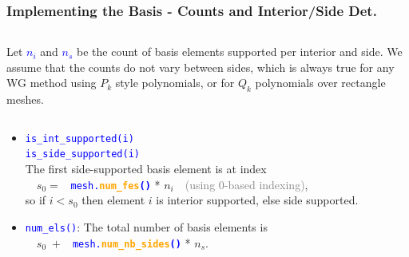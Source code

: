 \documentclass[compress]{beamer}
\begin{document}
\begin{frame}
  \frametitle{Implementing the Basis - Counts and Interior/Side Det.}
  \begin{columns}
      \small
      Let \textcolor{blue}{\large $n_i$} and \textcolor{blue}{\large $n_s$} be the count of basis elements supported per
      interior and side.
      {\scriptsize We assume that the counts do not vary between sides, which is always true for any WG method using
      $P_k$ style polynomials, or for $Q_k$ polynomials over rectangle meshes.}
  \end{columns}
  \begin{itemize}[<+->]
    \item {\texttt{\textcolor{blue}{is\_int\_supported(i)\\ is\_side\_supported(i)}}}\\
      The first side-supported basis element is at index\\
      $\quad s_0 = $ {\texttt{\textcolor{blue}{ mesh.\textbf{\textcolor{orange}{num\_fes}()}}} * $n_i\quad$}\textcolor{gray}{(using 0-based indexing)},\\
      so if $i < s_0$ then element $i$ is interior supported, else side supported.
    \item {\texttt{\textcolor{blue}{num\_els()}}}: The total number of basis elements is\\
        $\quad s_0 \;+ $ {\texttt{\textcolor{blue}{ mesh.\textbf{\textcolor{orange}{num\_nb\_sides}()}}} * $n_s$}.
  \end{itemize}
\end{frame}
\end{document}
